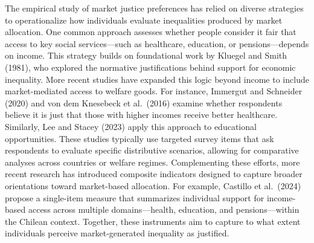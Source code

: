 \documentclass[
  12pt,
]{article}
\begin{document}
The empirical study of market justice preferences has relied on diverse
strategies to operationalize how individuals evaluate inequalities
produced by market allocation. One common approach assesses whether
people consider it fair that access to key social services---such as
healthcare, education, or pensions---depends on income. This strategy
builds on foundational work by Kluegel and Smith (1981), who explored
the normative justifications behind support for economic inequality.
More recent studies have expanded this logic beyond income to include
market-mediated access to welfare goods. For instance, Immergut and
Schneider (2020) and von dem Knesebeck et al.~(2016) examine whether
respondents believe it is just that those with higher incomes receive
better healthcare. Similarly, Lee and Stacey (2023) apply this approach
to educational opportunities. These studies typically use targeted
survey items that ask respondents to evaluate specific distributive
scenarios, allowing for comparative analyses across countries or welfare
regimes. Complementing these efforts, more recent research has
introduced composite indicators designed to capture broader orientations
toward market-based allocation. For example, Castillo et al.~(2024)
propose a single-item measure that summarizes individual support for
income-based access across multiple domains---health, education, and
pensions---within the Chilean context. Together, these instruments aim
to capture to what extent individuals perceive market-generated
inequality as justified.
\end{document}
